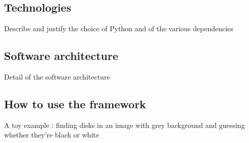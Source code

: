 \subsection{Technologies}
Describe and justify the choice of Python and of the various dependencies
\subsection{Software architecture}
Detail of the software architecture
\subsection{How to use the framework}
A toy example : finding disks in an image with grey background and guessing whether they're black or white 